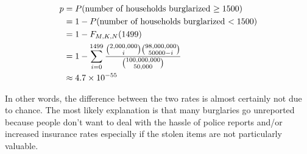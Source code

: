 \documentclass[11pt]{article}
\begin{document}
\begin{align*}
p &= P(\text{number of households burglarized $ \geq 1500 $}) \\
&= 1- P(\text{number of households burglarized $ < 1500 $}) \\
&= 1- F_{M, K, N}(1499) \\
&= 1-\sum_{i=0}^{1499} \dfrac{\binom{2,000,000}{i} \binom{98,000,000}{50000-i}}{\binom{100,000,000}{50,000}} \\
&\approx 4.7 \times 10^{-55}
\end{align*} 

In other words, the difference between the two rates is almost certainly not due to chance.  The most likely explanation is that many burglaries go unreported because people don't want to deal with the hassle of police reports and/or increased insurance rates especially if the stolen items are not particularly valuable.
\end{document}
